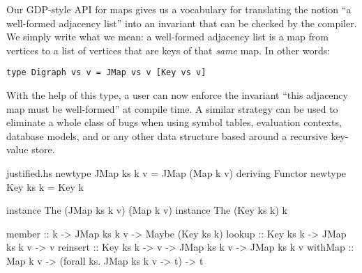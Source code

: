 \documentclass[format=sigplan, review=false, screen=true]{acmart}
\begin{document}
Our GDP-style API for maps gives us a vocabulary for
translating the notion ``a well-formed adjacency list'' into an invariant that can
be checked by the compiler. We simply write what we mean: a well-formed adjacency
list is a map from vertices to a list of vertices that are keys of that \emph{same} map.
In other words:
\begin{verbatim}
type Digraph vs v = JMap vs v [Key vs v]
\end{verbatim}
With the help of this type, a user can now enforce the invariant ``this adjacency map
must be well-formed'' at compile time. A similar strategy can be used to eliminate a
whole class of bugs when using symbol tables, evaluation contexts,
database models, and or any other data structure based around a recursive key-value store.

\begin{filecontents*}{justified.hs}
newtype JMap ks k v = JMap (Map k v) deriving Functor
newtype Key  ks k   = Key k

instance The (JMap ks k v) (Map k v)
instance The (Key ks k) k

member   :: k -> JMap ks k v -> Maybe (Key ks k)
lookup   :: Key ks k -> JMap ks k v -> v
reinsert :: Key ks k -> v -> JMap ks k v -> JMap ks k v
withMap  :: Map k v -> (forall ks. JMap ks k v -> t) -> t
\end{filecontents*}

\end{document}

